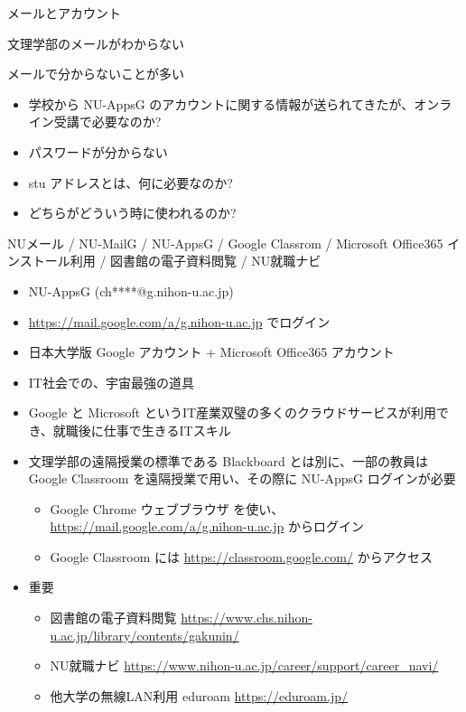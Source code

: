 \documentclass[a4j,10pt]{jsarticle}
\begin{document}
{\begin{frame}[label={sec:orgf27b200},fragile]{メールとアカウント}
\begin{block}{文理学部のメールがわからない}
\begin{itemize}
\begin{itemize}
\end{itemize}
\end{itemize}
\end{block}
\par
\begin{block}{メールで分からないことが多い}
\begin{itemize}
\item 学校から NU-AppsG のアカウントに関する情報が送られてきたが、オンライン受講で必要なのか?
\item パスワードが分からない
\par
\item stu アドレスとは、何に必要なのか?
\item どちらがどういう時に使われるのか?
\end{itemize}
\end{block}
\par
\begin{block}{NUメール / NU-MailG / NU-AppsG / Google Classrom / Microsoft Office365 インストール利用 / 図書館の電子資料閲覧 / NU就職ナビ}
\begin{itemize}
\item NU-AppsG (ch****@g.nihon-u.ac.jp)
\item \url{https://mail.google.com/a/g.nihon-u.ac.jp} でログイン
\item 日本大学版 Google アカウント + Microsoft Office365 アカウント
\item IT社会での、宇宙最強の道具
\item Google と Microsoft というIT産業双璧の多くのクラウドサービスが利用でき、就職後に仕事で生きるITスキル
\item 文理学部の遠隔授業の標準である Blackboard とは別に、一部の教員は Google Classroom を遠隔授業で用い、その際に NU-AppsG ログインが必要
\begin{itemize}
\item Google Chrome ウェブブラウザ を使い、 \url{https://mail.google.com/a/g.nihon-u.ac.jp} からログイン
\item Google Classroom には \url{https://classroom.google.com/} からアクセス
\end{itemize}
\item 重要
\begin{itemize}
\item 図書館の電子資料閲覧 \url{https://www.chs.nihon-u.ac.jp/library/contents/gakunin/}
\item NU就職ナビ \url{https://www.nihon-u.ac.jp/career/support/career\_navi/}
\item 他大学の無線LAN利用 eduroam \url{https://eduroam.jp/}

\end{itemize}
\end{itemize}
\end{block}
\end{frame}}
\end{document}
